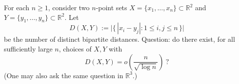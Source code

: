For each $n\ge 1$, consider two $n$-point sets $X=\{x_1,\ldots,x_n\}\subset\mathbb{R}^2$ and $Y=\{y_1,\ldots,y_n\}\subset\mathbb{R}^2$.
Let
\[
D(X,Y):=\bigl|\{\,|x_i-y_j|:1\le i,j\le n\,\}\bigr|
\]
be the number of distinct bipartite distances.
Question: do there exist, for all sufficiently large $n$, choices of $X,Y$ with
\[
D(X,Y)=o\!\left(\frac{n}{\sqrt{\log n}}\right)\ ?
\]
(One may also ask the same question in $\mathbb{R}^3$.)
